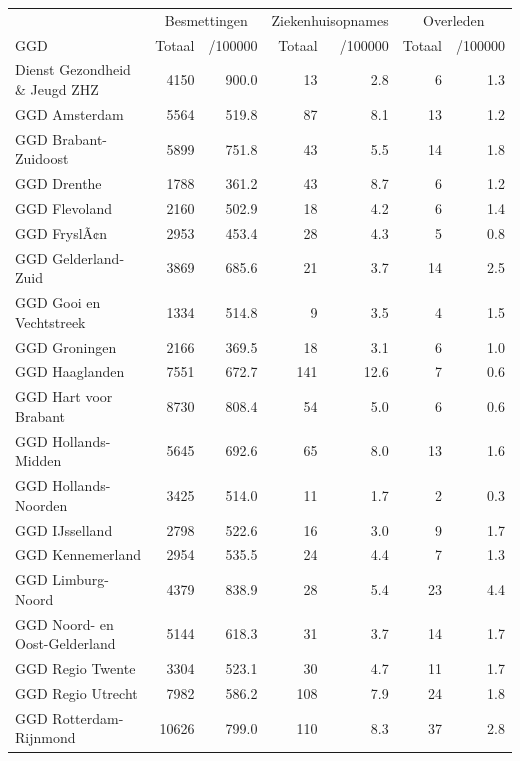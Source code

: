 \documentclass[
  english,
  man,floatsintext]{apa6}
\begin{document}
\begin{table}
\centering\begingroup\fontsize{10}{12}\selectfont

\begin{threeparttable}
\begin{tabular}{lrrrrrr}
\toprule
\multicolumn{1}{c}{ } & \multicolumn{2}{c}{Besmettingen} & \multicolumn{2}{c}{Ziekenhuisopnames} & \multicolumn{2}{c}{Overleden} \\
\cmidrule(l{3pt}r{3pt}){2-3} \cmidrule(l{3pt}r{3pt}){4-5} \cmidrule(l{3pt}r{3pt}){6-7}
GGD & Totaal & /100000 & Totaal & /100000 & Totaal & /100000\\
\midrule
Dienst Gezondheid \& Jeugd ZHZ & 4150 & 900.0 & 13 & 2.8 & 6 & 1.3\\
GGD Amsterdam & 5564 & 519.8 & 87 & 8.1 & 13 & 1.2\\
GGD Brabant-Zuidoost & 5899 & 751.8 & 43 & 5.5 & 14 & 1.8\\
GGD Drenthe & 1788 & 361.2 & 43 & 8.7 & 6 & 1.2\\
GGD Flevoland & 2160 & 502.9 & 18 & 4.2 & 6 & 1.4\\
GGD FryslÃ¢n & 2953 & 453.4 & 28 & 4.3 & 5 & 0.8\\
GGD Gelderland-Zuid & 3869 & 685.6 & 21 & 3.7 & 14 & 2.5\\
GGD Gooi en Vechtstreek & 1334 & 514.8 & 9 & 3.5 & 4 & 1.5\\
GGD Groningen & 2166 & 369.5 & 18 & 3.1 & 6 & 1.0\\
GGD Haaglanden & 7551 & 672.7 & 141 & 12.6 & 7 & 0.6\\
GGD Hart voor Brabant & 8730 & 808.4 & 54 & 5.0 & 6 & 0.6\\
GGD Hollands-Midden & 5645 & 692.6 & 65 & 8.0 & 13 & 1.6\\
GGD Hollands-Noorden & 3425 & 514.0 & 11 & 1.7 & 2 & 0.3\\
GGD IJsselland & 2798 & 522.6 & 16 & 3.0 & 9 & 1.7\\
GGD Kennemerland & 2954 & 535.5 & 24 & 4.4 & 7 & 1.3\\
GGD Limburg-Noord & 4379 & 838.9 & 28 & 5.4 & 23 & 4.4\\
GGD Noord- en Oost-Gelderland & 5144 & 618.3 & 31 & 3.7 & 14 & 1.7\\
GGD Regio Twente & 3304 & 523.1 & 30 & 4.7 & 11 & 1.7\\
GGD Regio Utrecht & 7982 & 586.2 & 108 & 7.9 & 24 & 1.8\\
GGD Rotterdam-Rijnmond & 10626 & 799.0 & 110 & 8.3 & 37 & 2.8\\

\end{tabular}
\end{threeparttable}
\end{table}
\end{document}
